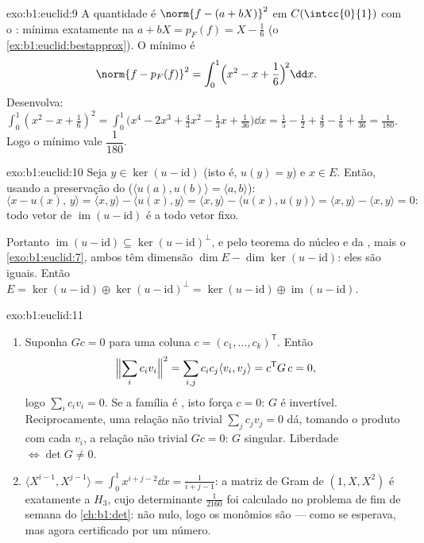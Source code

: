 \begin{solution}{exo:b1:euclid:9}
A quantidade é $\norm{f - (a + bX)}^2$ em $C(\intcc{0}{1})$ com o  : mínima
exatamente na  $a + bX = p_F(f) = X - \frac16$ (o \cref{ex:b1:euclid:bestapprox}). O mínimo é
\[
\norm{f - p_F(f)}^2 = \int_0^1 \Bigl(x^2 - x + \frac16\Bigr)^{\!2}
\dd x .
\]
Desenvolva: $\int_0^1 (x^2 - x + \frac16)^2 = \int_0^1 \bigl(x^4 - 2x^3
+ \frac{4}{3}x^2 - \frac13 x + \frac{1}{36}\bigr)\dd x = \frac15 -
\frac12 + \frac49 - \frac16 + \frac{1}{36} = \frac{1}{180}$. Logo o mínimo vale $\dfrac{1}{180}$.
\end{solution}

\begin{solution}{exo:b1:euclid:10}
Seja $y \in \ker(u - \mathrm{id})$ (isto é, $u(y) = y$) e $x \in E$. Então, usando a preservação
do  ($\langle u(a),
u(b)\rangle = \langle a, b\rangle$):
\[
\langle x - u(x),\, y\rangle
= \langle x, y\rangle - \langle u(x), y\rangle
= \langle x, y\rangle - \langle u(x), u(y)\rangle
= \langle x, y\rangle - \langle x, y\rangle = 0 :
\]
todo vetor de $\operatorname{im}(u - \mathrm{id})$ é  a todo vetor fixo.

Portanto $\operatorname{im}(u - \mathrm{id}) \subseteq \ker(u -
\mathrm{id})^{\perp}$, e pelo teorema do núcleo e da , mais o \cref{exo:b1:euclid:7},
ambos têm dimensão $\dim E - \dim\ker(u -
\mathrm{id})$: eles são iguais. Então $E = \ker(u - \mathrm{id})
\oplus \ker(u - \mathrm{id})^\perp = \ker(u - \mathrm{id}) \oplus
\operatorname{im}(u - \mathrm{id})$.
\end{solution}

\begin{solution}{exo:b1:euclid:11}
\begin{enumerate}
  \item Suponha $Gc = 0$ para uma coluna $c = (c_1, \dots,
        c_k)^{\mathsf T}$. Então
        \[
        \Bigl\lVert\sum_i c_i v_i\Bigr\rVert^2
        = \sum_{i,j} c_i c_j \langle v_i, v_j\rangle
        = c^{\mathsf T} G\, c = 0,
        \]
        logo $\sum_i c_i v_i = 0$. Se a família é , isto força $c = 0$: $G$ é
        invertível. Reciprocamente, uma relação não trivial $\sum_j c_j v_j = 0$
        dá, tomando o produto com cada $v_i$, a relação não trivial
        $Gc = 0$: $G$ singular. Liberdade $\iff \det G \neq 0$.
  \item $\langle X^{i-1}, X^{j-1}\rangle = \int_0^1 x^{i+j-2}\dd
        x = \frac{1}{i+j-1}$: a matriz de Gram de $(1, X, X^2)$ é exatamente a  $H_3$, cujo determinante $\frac1{2160}$ foi calculado no
        problema de fim de semana do \cref{ch:b1:det}: não nulo, logo os
        monômios são  --- como se esperava, mas agora
        certificado por um número.
\end{enumerate}
\end{solution}

